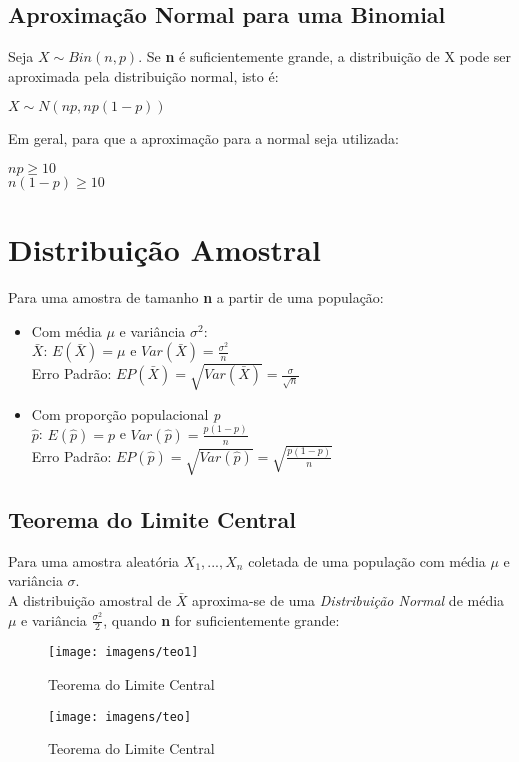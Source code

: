 \documentclass[a4paper, 12pt]{article}
\begin{document}
\subsection{Aproximação Normal para uma Binomial}
	Seja $X \sim Bin(n,p)$. Se \textbf{n} é suficientemente grande, a distribuição de X pode ser aproximada pela distribuição normal, isto é:
	\begin{center}
		\Large
		$
		X \sim N(np,np(1-p))
		$
	\end{center}
	Em geral, para que a aproximação para a normal seja utilizada:
	\begin{center}
		\Large
		$
		np\geq 10
		$\\
		$
		n(1-p)\geq 10
		$
	\end{center}
	
\section{Distribuição Amostral}
	Para uma amostra de tamanho \textbf{n} a partir de uma população:
	\begin{itemize}
		\item Com média $\mu$ e variância $\sigma^2$:\\
		$\bar{X}$: $E(\bar{X}) = \mu$ e $Var(\bar{X}) = \frac{\sigma^2}{n}$\\
		Erro Padrão: $EP(\bar{X}) = \sqrt{Var(\bar{X})} = \frac{\sigma}{\sqrt{n}}$
		
		
		\item Com proporção populacional \textit{p}\\
		$\hat{p}$: $E(\hat{p}) = p$ e $Var(\hat{p}) = \frac{p(1-p)}{n}$\\
		Erro Padrão: $EP(\hat{p})=\sqrt{Var(\hat{p})}=\sqrt{\frac{p(1-p)}{n}}$
	\end{itemize}

\subsection{Teorema do Limite Central}
	Para uma amostra aleatória $X_1, ..., X_n$ coletada de uma população com média $\mu$ e variância $\sigma$.\\
	
	A distribuição amostral de $\bar{X}$ aproxima-se de uma \textit{Distribuição Normal} de média $\mu$ e variância $\frac{\sigma^2}{2}$, quando \textbf{n} for suficientemente grande:
	
	\begin{figure}[h]
		\centering
		\texttt{[image: imagens/teo1]}
		\caption{Teorema do Limite Central}
		\label{fig:teo1}
	\end{figure}
	\newpage
	\begin{figure}[h]
		\centering
		\texttt{[image: imagens/teo]}
		\caption{Teorema do Limite Central}
		\label{fig:teo}
	\end{figure}
	









	
	
	
\end{document}
